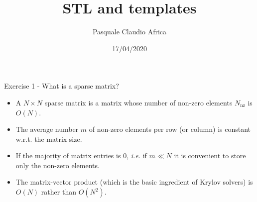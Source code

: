 \documentclass[10pt]{beamer}
\begin{document}
    \title{STL and templates}
    \author{Pasquale Claudio Africa}
    \date{17/04/2020}

\begin{frame}
    \maketitle
\end{frame}


\begin{frame}{Exercise 1 - What is a sparse matrix?}
\begin{itemize}
\item A $N \times N$ sparse matrix is a matrix whose number of non-zero elements $N_\mathrm{nz}$ is $O(N)$. \\[3mm]
\item The average number $m$ of non-zero elements per row (or column)
is constant w.r.t. the matrix size. \\[3mm]
\item If the majority of matrix entries is $0$, {\it i.e.} if $m \ll N$ it is convenient to store only the non-zero elements.\\[3mm]
\item The matrix-vector product (which is the basic ingredient of Krylov solvers) is $O(N)$ rather than $O(N^{2})$.\\[3mm]
\end{itemize}
\end{frame}
\end{document}
